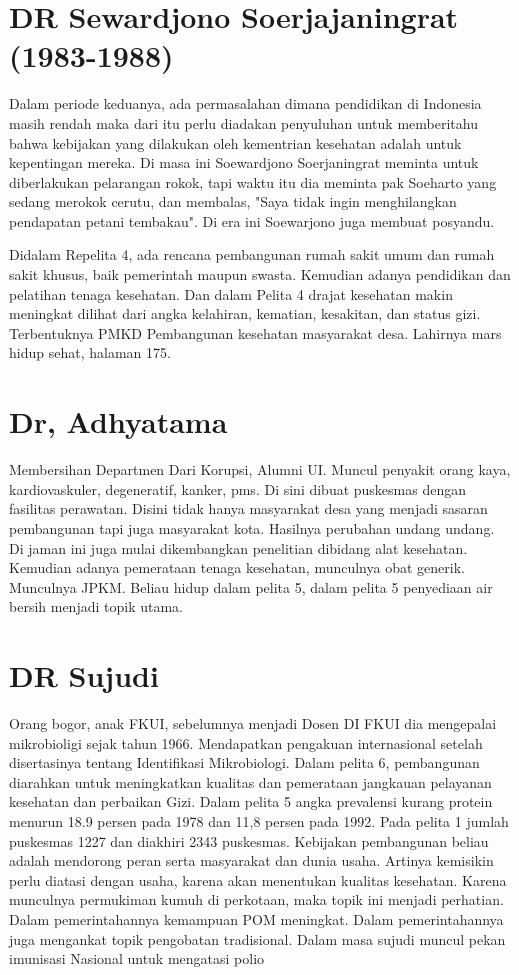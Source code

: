 \documentclass[11pt]{article}
\begin{document}
\section{DR Sewardjono Soerjajaningrat (1983-1988)}
\label{sec:org9cc6210}
Dalam periode keduanya, ada permasalahan dimana pendidikan di Indonesia masih
rendah maka dari itu perlu diadakan penyuluhan untuk memberitahu bahwa
kebijakan yang dilakukan oleh kementrian kesehatan adalah untuk kepentingan
mereka. Di masa ini Soewardjono Soerjaningrat meminta untuk diberlakukan
pelarangan rokok, tapi waktu itu dia meminta pak Soeharto yang sedang merokok
cerutu, dan membalas, "Saya tidak ingin menghilangkan pendapatan petani
tembakau". Di era ini Soewarjono juga membuat posyandu.

Didalam Repelita 4, ada rencana pembangunan rumah sakit umum dan rumah sakit
khusus, baik pemerintah maupun swasta. Kemudian adanya pendidikan dan pelatihan
tenaga kesehatan. Dan dalam Pelita 4 drajat kesehatan makin meningkat dilihat
dari angka kelahiran, kematian, kesakitan, dan status gizi. Terbentuknya PMKD
Pembangunan kesehatan masyarakat desa. Lahirnya mars hidup sehat, halaman 175.


\section{Dr, Adhyatama}
\label{sec:orgcd7bbc2}
Membersihan Departmen Dari Korupsi, Alumni UI.
Muncul penyakit orang kaya, kardiovaskuler, degeneratif,
kanker, pms.
Di sini dibuat puskesmas dengan fasilitas perawatan. Disini tidak hanya masyarakat
desa yang menjadi sasaran pembangunan tapi juga masyarakat kota. Hasilnya
perubahan undang undang. Di jaman ini juga mulai dikembangkan penelitian
dibidang alat kesehatan. Kemudian adanya pemerataan tenaga kesehatan, munculnya
obat generik. Munculnya JPKM. Beliau hidup dalam pelita 5, dalam pelita 5
penyediaan air bersih menjadi topik utama.

\section{DR Sujudi}
\label{sec:org40bb59c}
Orang bogor, anak FKUI, sebelumnya menjadi Dosen DI FKUI dia mengepalai
mikrobioligi sejak tahun 1966. Mendapatkan pengakuan internasional setelah
disertasinya tentang Identifikasi Mikrobiologi. Dalam pelita 6, pembangunan
diarahkan untuk meningkatkan kualitas dan pemerataan jangkauan pelayanan
kesehatan dan perbaikan Gizi. Dalam pelita 5 angka prevalensi kurang protein
menurun 18.9 persen  pada 1978 dan 11,8 persen pada 1992. Pada pelita 1
jumlah puskesmas 1227 dan diakhiri 2343 puskesmas.
Kebijakan pembangunan beliau adalah mendorong peran serta masyarakat dan
dunia usaha. Artinya kemisikin perlu diatasi dengan usaha, karena akan
menentukan kualitas kesehatan. Karena munculnya permukiman kumuh di perkotaan,
maka topik ini menjadi perhatian. Dalam pemerintahannya kemampuan POM meningkat.
Dalam pemerintahannya juga mengankat topik pengobatan tradisional.
Dalam masa sujudi muncul pekan imunisasi Nasional untuk mengatasi polio
\end{document}
